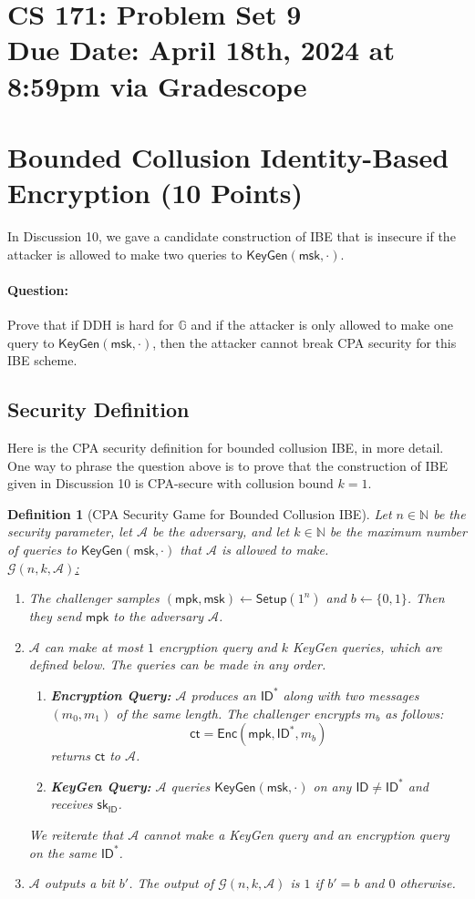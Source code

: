 \documentclass[11pt]{article}
\newtheorem{definition}[theorem]{Definition}
\numberwithin{equation}{section}
\newcommand{\enc}{\mathsf{Enc}}
\newcommand{\setup}{\mathsf{Setup}}
\newcommand{\keygen}{\mathsf{KeyGen}}
\newcommand{\mpk}{\mathsf{mpk}}
\newcommand{\msk}{\mathsf{msk}}
\newcommand{\sk}{\mathsf{sk}}
\newcommand{\id}{\mathsf{ID}}
\newcommand{\ct}{\mathsf{ct}}
\newcommand{\A}{\mathcal{A}}
\newcommand{\G}{\mathcal{G}}
\newcommand{\GG}{\mathbb{G}}
\newcommand{\bin}{\{0,1\}}
\newcommand{\bit}{\bin}
\newcommand{\duedate}{April 18th, 2024 at 8:59pm via Gradescope}
\begin{document}
\section*{CS 171: Problem Set 9\\ {\small Due Date: \duedate} }

\section{Bounded Collusion Identity-Based Encryption (10 Points)}
In Discussion 10, we gave a candidate construction of IBE that is insecure if the attacker is allowed to make two queries to $\keygen(\msk, \cdot)$.

\paragraph{Question:} Prove that if DDH is hard for $\GG$ and if the attacker is only allowed to make one query to $\keygen(\msk, \cdot)$, then the attacker cannot break CPA security for this IBE scheme.

\subsection*{Security Definition}
Here is the CPA security definition for bounded collusion IBE, in more detail. One way to phrase the question above is to prove that the construction of IBE given in Discussion 10 is CPA-secure with collusion bound $k=1$.
\begin{definition}[CPA Security Game for Bounded Collusion IBE]
Let $n\in \mathbb{N}$ be the security parameter, let $\A$ be the adversary, and let $k \in \mathbb{N}$ be the maximum number of queries to $\keygen(\msk, \cdot)$ that $\A$ is allowed to make.\\

\underline{$\G(n, k, \A)$:}
\begin{enumerate}
    \item The challenger samples $(\mpk, \msk) \leftarrow \setup(1^n)$ and $b \leftarrow \bit$. Then they send $\mpk$ to the adversary $\A$.
    \item $\A$ can make at most $1$ encryption query and $k$ KeyGen queries, which are defined below. The queries can be made in any order.
    \begin{enumerate}
        \item \textbf{Encryption Query:} $\A$ produces an $\id^*$ along with two messages $(m_0, m_1)$ of the same length. The challenger encrypts $m_b$ as follows:
        \[\ct = \enc(\mpk, \id^*, m_b)\]
        returns $\ct$ to $\A$.
        \item \textbf{KeyGen Query:} $\A$ queries $\keygen(\msk, \cdot)$ on any $\id \neq \id^*$ and receives $\sk_\id$. 
    \end{enumerate}
    We reiterate that $\A$ cannot make a KeyGen query and an encryption query on the same $\id^*$.
    \item $\A$ outputs a bit $b'$. The output of $\G(n, k, \A)$ is $1$ if $b' = b$ and $0$ otherwise.
\end{enumerate}
\end{definition}
\end{document}
